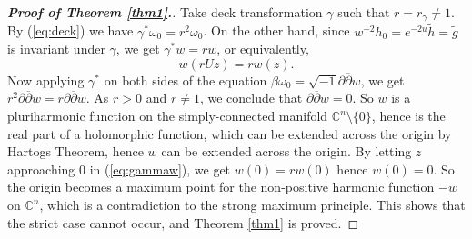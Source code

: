 \documentclass{amsart}
\numberwithin{equation}{section}
\begin{document}
\begin{proof}[{\bf Proof of Theorem \ref{thm1}.}]
Take deck transformation $\gamma$ such that $r=r_{\gamma} \neq 1$. By (\ref{eq:deck}) we have $\gamma^{\ast}\omega_0=r^2\omega_0$. On the other hand, since $w^{-2}h_0 = e^{-2u}\widetilde h = \widetilde g$ is invariant under $\gamma$, we get $\gamma^{\ast}w=rw$, or equivalently,
\begin{equation} \label{eq:gammaw}
w(rUz)=rw(z).
 \end{equation}
 Now applying $\gamma^{\ast}$ on both sides of the equation $\beta \omega_0=\sqrt{-1}\partial \overline{\partial}w$, we get $r^2\partial \overline{\partial}w = r\partial \overline{\partial}w$. As $r>0$ and $r\neq 1$, we conclude that $\partial \overline{\partial}w=0$. So $w$ is a pluriharmonic function on the simply-connected manifold ${\mathbb C}^n\setminus \{0\}$, hence is the real part of a holomorphic function, which can be extended across the origin by Hartogs Theorem, hence $w$ can be extended across the origin. By letting $z$ approaching $0$ in  (\ref{eq:gammaw}), we get $w(0)=rw(0)$ hence $w(0)=0$. So the origin becomes a maximum point for the non-positive harmonic function $-w$ on ${\mathbb C}^n$, which is a contradiction to the strong maximum principle. This shows that the strict case cannot occur, and Theorem \ref{thm1} is proved.
\end{proof}


\end{document}
